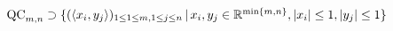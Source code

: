 \begin{frame}
	\begin{exampleblock}{$ \textup{QC}_{m,n} \supset \{ (\langle x_i,y_j \rangle)_{1 \le 1 \le m, 1 \le j \le n} \,| \, x_i,y_j \in \mathbb{R}^{ \min \{m,n \} }, \vert x_i  \vert \le 1, \vert y_j \vert \le 1  \} $}
	\end{exampleblock}
\end{frame}



